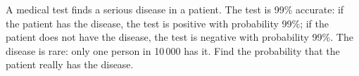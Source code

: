 \label{prob:medical-test}
A medical test finds a serious disease in a patient. The test is 99\%
accurate: if the patient has the disease, the test is positive with
probability 99\%; if the patient does not have the disease, the test is
negative with probability 99\%. The disease is rare: only one person in
10\,000 has it. Find the probability that the patient really has the
disease.

